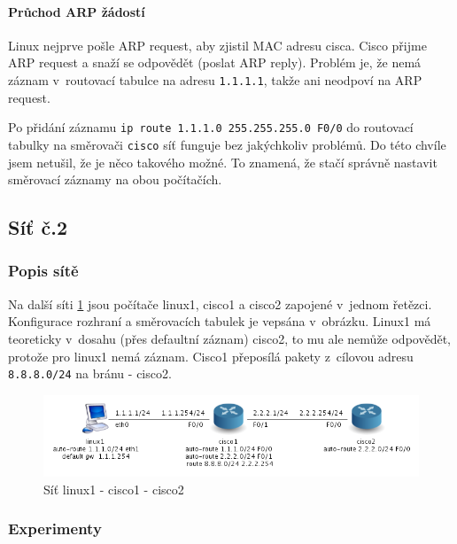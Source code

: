 \paragraph{Průchod ARP žádostí}
Linux nejprve pošle ARP request, aby zjistil MAC adresu cisca. Cisco přijme ARP request a snaží se odpovědět (poslat ARP reply). Problém je, že nemá záznam v~routovací tabulce na adresu \verb|1.1.1.1|, takže ani neodpoví na ARP request.

Po přidání záznamu \verb|ip route 1.1.1.0 255.255.255.0 F0/0| do routovací tabulky na směrovači \verb|cisco| síť funguje bez jakýchkoliv problémů. Do této chvíle jsem netušil, že je něco takového možné. To znamená, že stačí správně nastavit směrovací záznamy na obou počítačích.


\subsection{Síť č.2}
\subsubsection{Popis sítě}
Na další síti \ref{fig:sit_3pc} jsou počítače linux1, cisco1 a cisco2 zapojené v~jednom řetězci. Konfigurace rozhraní a směrovacích tabulek je vepsána v~obrázku. Linux1 má teoreticky v~dosahu (přes defaultní záznam) cisco2, to mu ale nemůže odpovědět, protože pro linux1 nemá záznam. Cisco1 přeposílá pakety z~cílovou adresu \verb|8.8.8.0/24| na bránu - cisco2.

\begin{figure}[h]
\begin{center}
\includegraphics[width=15cm]{figures/sit_3pc.png}
\caption{Síť linux1 - cisco1 - cisco2}
\label{fig:sit_3pc}
\end{center}
\end{figure}


\newpage

\subsubsection{Experimenty} 

